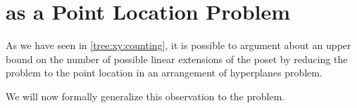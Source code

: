 \chapter{\kSUM as a Point Location Problem}

As we have seen in \ref{tree:xy:counting}, it is possible to argument about an upper
bound on the number of possible linear extensions of the poset \XY by
reducing the problem to the point location in an
arrangement of hyperplanes problem.

We will now formally generalize this observation to the \kSUM problem.
